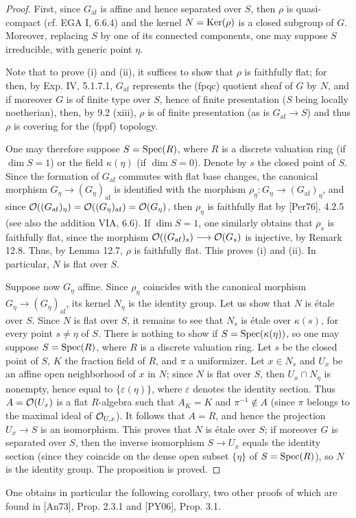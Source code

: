 \begin{proof}
First, since $G_{\mathrm{af}}$ is affine and hence separated over $S$, then $\rho$ is quasi-compact (cf. EGA I, 6.6.4) and the kernel $N=\operatorname{Ker}(\rho)$ is a closed subgroup of $G$. Moreover, replacing $S$ by one of its connected components, one may suppose $S$ irreducible, with generic point $\eta$.

Note that to prove (i) and (ii), it suffices to show that $\rho$ is faithfully flat; for then, by Exp. IV, 5.1.7.1, $G_{\mathrm{af}}$ represents the (fpqc) quotient sheaf of $G$ by $N$, and if moreover $G$ is of finite type over $S$, hence of finite presentation ($S$ being locally noetherian), then, by 9.2 (xiii), $\rho$ is of finite presentation (as is $G_{\mathrm{af}}\to S$) and thus $\rho$ is covering for the (fppf) topology.

One may therefore suppose $S=\operatorname{Spec}(R)$, where $R$ is a discrete valuation ring (if $\dim S=1$) or the field $\kappa(\eta)$ (if $\dim S=0$). Denote by $s$ the closed point of $S$. Since the formation of $G_{\mathrm{af}}$ commutes with flat base changes, the canonical morphism $G_\eta\to(G_\eta)_{\mathrm{af}}$ is identified with the morphism $\rho_\eta:G_\eta\to(G_{\mathrm{af}})_\eta$, and since $\mathcal{O}((G_{\mathrm{af}})_\eta)=\mathcal{O}((G_\eta)_{\mathrm{af}})=\mathcal{O}(G_\eta)$, then $\rho_\eta$ is faithfully flat by [Per76], 4.2.5 (see also the addition VIA, 6.6). If $\dim S=1$, one similarly obtains that $\rho_s$ is faithfully flat, since the morphism $\mathcal{O}((G_{\mathrm{af}})_s)\longrightarrow\mathcal{O}(G_s)$ is injective, by Remark 12.8. Thus, by Lemma 12.7, $\rho$ is faithfully flat. This proves (i) and (ii). In particular, $N$ is flat over $S$.

Suppose now $G_\eta$ affine. Since $\rho_\eta$ coincides with the canonical morphism $G_\eta\to(G_\eta)_{\mathrm{af}}$, its kernel $N_\eta$ is the identity group. Let us show that $N$ is étale over $S$. Since $N$ is flat over $S$, it remains to see that $N_s$ is étale over $\kappa(s)$, for every point $s\ne\eta$ of $S$. There is nothing to show if $S=\operatorname{Spec}(\kappa(\eta))$, so one may suppose $S=\operatorname{Spec}(R)$, where $R$ is a discrete valuation ring. Let $s$ be the closed point of $S$, $K$ the fraction field of $R$, and $\pi$ a uniformizer. Let $x\in N_s$ and $U_x$ be an affine open neighborhood of $x$ in $N$; since $N$ is flat over $S$, then $U_x\cap N_\eta$ is nonempty, hence equal to $\{\varepsilon(\eta)\}$, where $\varepsilon$ denotes the identity section. Thus $A=\mathcal{O}(U_x)$ is a flat $R$-algebra such that $A_K=K$ and $\pi^{-1}\notin A$ (since $\pi$ belongs to the maximal ideal of $\mathcal{O}_{U,x}$). It follows that $A=R$, and hence the projection $U_x\to S$ is an isomorphism. This proves that $N$ is étale over $S$; if moreover $G$ is separated over $S$, then the inverse isomorphism $S\to U_x$ equals the identity section (since they coincide on the dense open subset $\{\eta\}$ of $S=\operatorname{Spec}(R)$), so $N$ is the identity group. The proposition is proved.
\end{proof}
One obtains in particular the following corollary, two other proofs of which are found in [An73], Prop. 2.3.1 and [PY06], Prop. 3.1.

